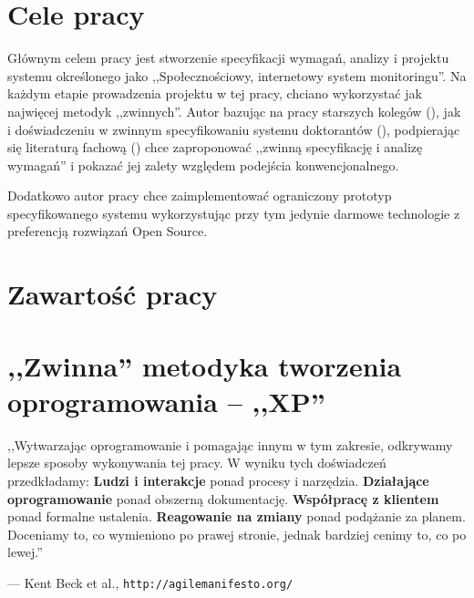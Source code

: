\newpage


\section{Cele pracy}
\label{sec:celePracy}

Głównym celem pracy jest stworzenie specyfikacji wymagań, analizy i projektu systemu określonego jako ,,Społecznościowy, internetowy system monitoringu''. Na każdym etapie prowadzenia projektu w tej pracy, chciano wykorzystać jak najwięcej metodyk ,,zwinnych''. Autor bazując na pracy starszych kolegów (\cite{JakMich06}), jak i doświadczeniu w zwinnym specyfikowaniu systemu doktorantów (\cite{Mad09}), podpierając się literaturą fachową (\cite{Bec99}) chce zaproponować ,,zwinną specyfikację i analizę wymagań'' i pokazać jej zalety względem podejścia konwencjonalnego.

Dodatkowo autor pracy chce zaimplementować ograniczony prototyp specyfikowanego systemu wykorzystując przy tym jedynie darmowe technologie z preferencją rozwiązań Open Source.


\section{Zawartość pracy}
\label{sec:zawartoscPracy}

\todo

\newpage


\section{,,Zwinna'' metodyka tworzenia oprogramowania -- ,,XP''}
\label{sec:ZMTO}


\begin{center}
    ,,Wytwarzając oprogramowanie i pomagając innym w tym zakresie,\newline
    odkrywamy lepsze sposoby wykonywania tej pracy.\newline
    W wyniku tych doświadczeń przedkładamy:\newline
    \newline
    \textbf{Ludzi i interakcje} ponad procesy i narzędzia.\newline
    \textbf{Działające oprogramowanie} ponad obszerną dokumentację.\newline
    \textbf{Współpracę z klientem} ponad formalne ustalenia.\newline
    \textbf{Reagowanie na zmiany} ponad podążanie za planem.\newline
    \newline
    Doceniamy to, co wymieniono po prawej stronie,\newline
    jednak bardziej cenimy to, co po lewej.''
\end{center}
 \hfill --- Kent Beck et al., \texttt{http://agilemanifesto.org/}


